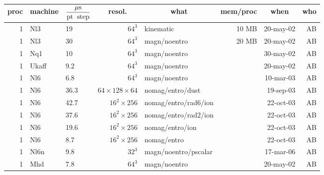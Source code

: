 \documentclass[\mydriver,12pt,twoside,notitlepage,a4paper]{article}
\newcommand{\mcc}[1]{\multicolumn{1}{c}{#1}}
\begin{document}
\small %
\begin{center}
    \begin{small}
    \begin{longtable}{rllrlrrr}
    \toprule
   \mcc{proc}
     & \mcc{machine}
             & \mcc{$\displaystyle\frac{{\mu\rm s}}{\rm pt\;\;step}$}
                    & \mcc{resol.} 
                              & \mcc{what}
                                             & \mcc{mem/proc}
                                                      & \mcc{when}&\mcc{who}\\
    \midrule
   1 & Nl3   &  19  &  $64^3$ & kinematic    &  10 MB & 20-may-02 & AB \\
   1 & Nl3   &  30  &  $64^3$ & magn/noentro &  20 MB & 20-may-02 & AB \\
   1 & Nq1   &  10  &  $64^3$ & magn/noentro &        & 30-may-02 & AB \\
   1 & Ukaff & 9.2  &  $64^3$ & magn/noentro &        & 20-may-02 & AB \\
   1 & Nl6   & 6.8  &  $64^3$ & magn/noentro &        & 10-mar-03 & AB \\
   1 & Nl6   & 36.3 &  $64\!\times\!128\!\times\!64$
                              & nomag/entro/dust &    & 19-sep-03 & AB \\
   1 & Nl6   & 42.7 & $16^2{\times}256$                                  
                     & nomag/entro/rad6/ion &        & 22-oct-03 & AB \\
   1 & Nl6   & 37.6 & $16^2{\times}256$                                  
                     & nomag/entro/rad2/ion &        & 22-oct-03 & AB \\
   1 & Nl6   & 19.6 & $16^2{\times}256$                                  
                      & nomag/entro/ion &      & 22-oct-03 & AB \\
   1 & Nl6   &  8.7 & $16^2{\times}256$ & nomag/entro &      & 22-oct-03 & AB \\
   1 & Nl6n  &  9.8 & $32^3$                                  
                    & magn/noentro/pscalar   &        & 17-mar-06 & AB \\
   1 & Mhd   & 7.8  &  $64^3$ & magn/noentro &        & 20-may-02 & AB \\

\end{longtable}
\end{small}
\end{center}
\end{document}
